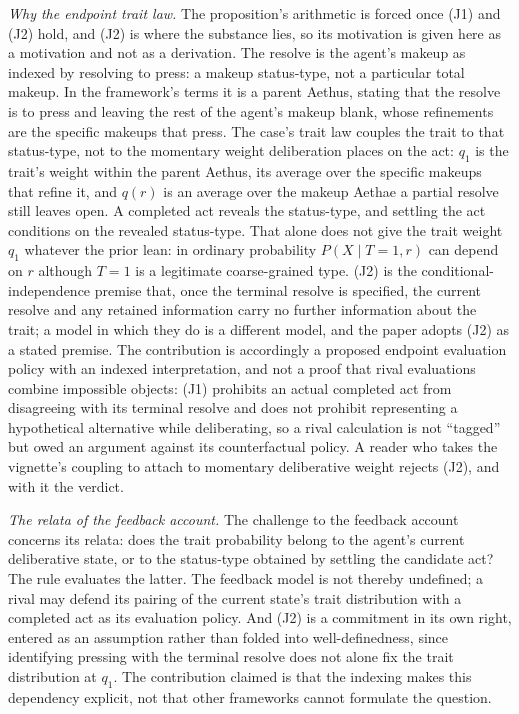 \noindent\emph{Why the endpoint trait law.} The proposition's arithmetic is forced once (J1) and (J2) hold, and (J2) is where the substance lies, so its motivation is given here as a motivation and not as a derivation. The resolve is the agent's makeup as indexed by resolving to press: a makeup status-type, not a particular total makeup. In the framework's terms it is a parent Aethus, stating that the resolve is to press and leaving the rest of the agent's makeup blank, whose refinements are the specific makeups that press. The case's trait law couples the trait to that status-type, not to the momentary weight deliberation places on the act: $q_1$ is the trait's weight within the parent Aethus, its average over the specific makeups that refine it, and $q(r)$ is an average over the makeup Aethae a partial resolve still leaves open. A completed act reveals the status-type, and settling the act conditions on the revealed status-type. That alone does not give the trait weight $q_1$ whatever the prior lean: in ordinary probability $P(X \mid T = 1, r)$ can depend on $r$ although $T = 1$ is a legitimate coarse-grained type. (J2) is the conditional-independence premise that, once the terminal resolve is specified, the current resolve and any retained information carry no further information about the trait; a model in which they do is a different model, and the paper adopts (J2) as a stated premise. The contribution is accordingly a proposed endpoint evaluation policy with an indexed interpretation, and not a proof that rival evaluations combine impossible objects: (J1) prohibits an actual completed act from disagreeing with its terminal resolve and does not prohibit representing a hypothetical alternative while deliberating, so a rival calculation is not ``tagged'' but owed an argument against its counterfactual policy. A reader who takes the vignette's coupling to attach to momentary deliberative weight rejects (J2), and with it the verdict.

\noindent\emph{The relata of the feedback account.} The challenge to the feedback account concerns its relata: does the trait probability belong to the agent's current deliberative state, or to the status-type obtained by settling the candidate act? The rule evaluates the latter. The feedback model is not thereby undefined; a rival may defend its pairing of the current state's trait distribution with a completed act as its evaluation policy. And (J2) is a commitment in its own right, entered as an assumption rather than folded into well-definedness, since identifying pressing with the terminal resolve does not alone fix the trait distribution at $q_1$. The contribution claimed is that the indexing makes this dependency explicit, not that other frameworks cannot formulate the question.

